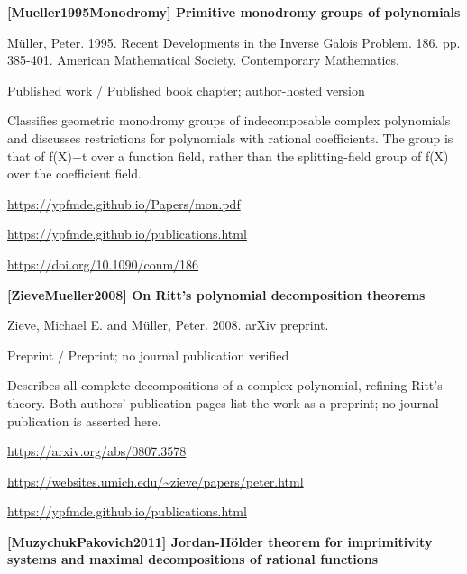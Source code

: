\documentclass[11pt,a4paper,oneside,openany]{book}
\begin{document}
\vspace{9pt}
\hypertarget{ref:Mueller1995Monodromy}{}
{\sffamily\bfseries\color{atlasgreen}[Mueller1995Monodromy] Primitive monodromy groups of polynomials}\par
\color{black} Müller, Peter. 1995. Recent Developments in the Inverse Galois Problem. 186. pp. 385-401. American Mathematical Society. Contemporary Mathematics.\par
{\small\sffamily\color{atlasgold}Published work / Published book chapter; author-hosted version}\par
\color{black} Classifies geometric monodromy groups of indecomposable complex polynomials and discusses restrictions for polynomials with rational coefficients. The group is that of f(X)\ensuremath{-}t over a function field, rather than the splitting-field group of f(X) over the coefficient field.\par
{\footnotesize\url{https://ypfmde.github.io/Papers/mon.pdf}}\par
{\footnotesize\url{https://ypfmde.github.io/publications.html}}\par
{\footnotesize\url{https://doi.org/10.1090/conm/186}}\par
\vspace{9pt}
\hypertarget{ref:ZieveMueller2008}{}
{\sffamily\bfseries\color{atlasgreen}[ZieveMueller2008] On Ritt's polynomial decomposition theorems}\par
\color{black} Zieve, Michael E. and Müller, Peter. 2008. arXiv preprint.\par
{\small\sffamily\color{atlasgold}Preprint / Preprint; no journal publication verified}\par
\color{black} Describes all complete decompositions of a complex polynomial, refining Ritt's theory. Both authors' publication pages list the work as a preprint; no journal publication is asserted here.\par
{\footnotesize\url{https://arxiv.org/abs/0807.3578}}\par
{\footnotesize\url{https://websites.umich.edu/~zieve/papers/peter.html}}\par
{\footnotesize\url{https://ypfmde.github.io/publications.html}}\par
\vspace{9pt}
\hypertarget{ref:MuzychukPakovich2011}{}
{\sffamily\bfseries\color{atlasgreen}[MuzychukPakovich2011] Jordan-Hölder theorem for imprimitivity systems and maximal decompositions of rational functions}\par
\end{document}
